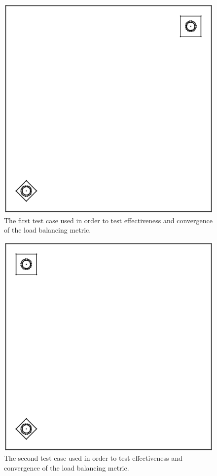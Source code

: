 \documentclass{anstrans}
\begin{document}
\begin{figure}
\centering
\includegraphics[scale = 0.5]{figures/unbalanced_lattice.eps}
\caption{The first test case used in order to test effectiveness and convergence of the load balancing metric.}
\label{opp}
\end{figure}

\begin{figure}
\centering
\includegraphics[scale = 0.5]{figures/unbalanced_pins_same_side.eps}
\caption{The second test case used in order to test effectiveness and convergence of the load balancing metric.}
\label{same}
\end{figure}
\end{document}
